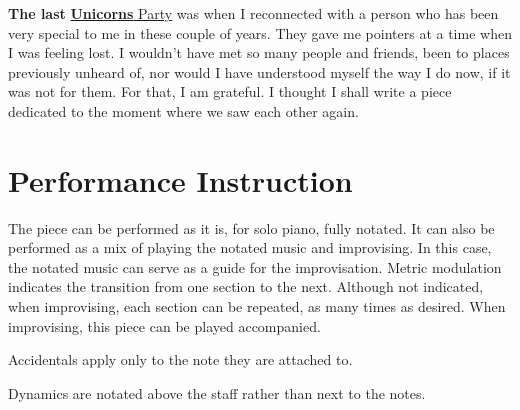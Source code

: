 \documentclass{article}
\begin{document}
\textbf{The last}
\href{https://www.unicornsparty.com/}{\textbf{Unicorns} Party} was when
I reconnected with a person who has been very special to me in these
couple of years.  They gave me pointers at a time when I was feeling
lost. I wouldn't have met so many people and friends, been to places
previously unheard of, nor would I have understood myself the way I do
now, if it was not for them. For that, I am grateful. I thought I shall
write a piece dedicated to the moment where we saw each other again.

\section*{Performance Instruction}
The piece can be performed as it is, for solo piano, fully notated.
%
It can also be performed as a mix of playing the notated music and
improvising.
%
In this case, the notated music can serve as a guide for the
improvisation.
%
Metric modulation indicates the transition from one section to the next.
Although not indicated, when improvising, each section can be repeated,
as many times as desired.
%
When improvising, this piece can be played accompanied.

\noindent
Accidentals apply only to the note they are attached to.

\noindent
Dynamics are notated above the staff rather than next to the notes.
\end{document}
